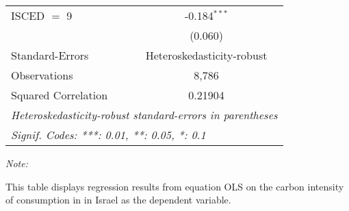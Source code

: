 \begin{table}[htbp!]
\begin{adjustbox}{width = 1\textwidth, max height = 0.95\textheight, center}
\begin{threeparttable}[b]
\begin{tabular}{lc}
            ISCED $=$ 9         & -0.184$^{***}$\\   
                                & (0.060)\\   
            \midrule 
            Standard-Errors     & Heteroskedasticity-robust \\   
            Observations        & 8,786\\  
            Squared Correlation & 0.21904\\  
            \midrule \midrule
            \multicolumn{2}{l}{\emph{Heteroskedasticity-robust standard-errors in parentheses}}\\
            \multicolumn{2}{l}{\emph{Signif. Codes: ***: 0.01, **: 0.05, *: 0.1}}\\
         \end{tabular}
         
         \begin{tablenotes}\item \medskip \textit{Note:}
            \item This table displays regression results from equation OLS on the carbon intensity of consumption in  in Israel as the dependent variable. 
         \end{tablenotes}
      \end{threeparttable}
   \end{adjustbox}
\end{table}



